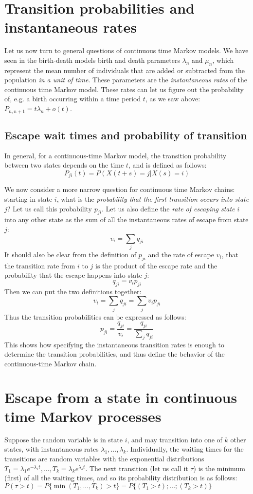 \documentclass[11pt]{book}
\begin{document}
\section{Transition probabilities and instantaneous rates}
Let us now turn to general questions of continuous time Markov models. We have seen in the birth-death models birth and death parameters $\lambda_n$ and $\mu_n$, which represent the mean number of individuals that are added or subtracted from the population \emph{in a unit of time}. These parameters are the \emph{instantaneous rates} of the continuous time Markov model. These rates can let us figure out the probability of, e.g. a birth occurring within a time period $t$, as we saw above: 
$P_{n,n+1} = t \lambda_n + o(t)$. 

\subsection{Escape wait times and probability of transition}
In general, for a continuous-time Markov model, the transition probability between two states depends on the time $t$, and is defined as follows:
$$ P_{ji}(t) = P(X(t+s) = j | X(s) = i)$$

We now consider a more narrow question for continuous time Markov chains: starting in state $i$, what is the \emph{probability that the first transition occurs into state} $j$? Let us call this probability $p_{ji}$. Let us also define the \emph{rate of escaping state $i$} into any other state as the sum of all the instantaneous rates of escape from state $j$:
$$v_{i} = \sum_{j} q_{ji}$$
It should also be clear from the definition of $p_{ji}$ and the rate of escape $v_i$, that the transition rate from $i$ to $j$ is the product of the escape rate and the probability that the escape happens into state $j$:
$$ q_{ji} = v_i p_{ji}$$
Then we can put the two definitions together:
$$ v_i = \sum_{j} q_{ji}  = \sum_j v_i p_{ji}$$ 
Thus the transition probabilities can be expressed as follows:
$$p_{ji} = \frac{q_{ji}}{v_i} = \frac{q_{ji}}{\sum_j q_{ji}}$$
This shows how specifying the instantaneous transition rates is enough to determine the transition probabilities, and thus define the behavior of the continuous-time Markov chain. 


\section{Escape from a state in continuous time Markov processes}
Suppose the random variable is in state $i$, and may transition into one of $k$ other states, with instantaneous rates $\lambda_1, ..., \lambda_k$. Individually, the waiting times for the transitions are random variables with the exponential distributions  $T_1 = \lambda_1e^{-\lambda_1 t}, ...,T_k = \lambda_k e^{\lambda_k t}$. The next transition (let us call it $\tau$) is the minimum (first) of all the waiting times, and so its probability distribution is as follows: $P(\tau > t) = P \{ \min( T_1, ..., T_k) > t \} = P \{ (T_1 > t); ... ; (T_k > t) \} $
\end{document}
